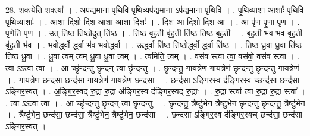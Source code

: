 \documentclass[17pt]{extarticle}
\begin{document}
28. शक्त्येति॒ शक्त्या᳚ । . अप॑द्यमाना पृथिवि पृथि॒व्यप॑द्यमा॒ना ऽप॑द्यमाना पृथिवि । . पृ॒थि॒व्याशा॒ आशाः᳚ पृथिवि पृथि॒व्याशाः᳚ । . आशा॒ दिशो॒ दिश॒ आशा॒ आशा॒ दिशः॑ । . दिश॒ आ दिशो॒ दिश॒ आ । . आ पृ॑ण पृ॒णा पृ॑ण । . पृ॒णेति॑ पृण । . उत् ति॑ष्ठ ति॒ष्ठोदुत् ति॑ष्ठ । . ति॒ष्ठ॒ बृ॒ह॒ती बृ॑ह॒ती ति॑ष्ठ तिष्ठ बृह॒ती । . बृ॒ह॒ती भ॑व भव बृह॒ती बृ॑ह॒ती भ॑व । . भ॒वो॒र्द्ध्वो र्द्ध्वा भ॑व भवो॒र्द्ध्वा । . ऊ॒र्द्ध्वा ति॑ष्ठ तिष्ठो॒र्द्ध्वो र्द्ध्वा ति॑ष्ठ । . ति॒ष्ठ॒ ध्रु॒वा ध्रु॒वा ति॑ष्ठ तिष्ठ ध्रु॒वा । . ध्रु॒वा त्वम् त्वम् ध्रु॒वा ध्रु॒वा त्वम् । . त्वमिति॒ त्वम् । . वस॑व स्त्वा त्वा॒ वस॑वो॒ वस॑व स्त्वा । . त्वा ऽऽत्वा॒ त्वा । . आ च्छृ॑न्दन्तु छृन्द॒न् त्वा छृ॑न्दन्तु । . छृ॒न्द॒न्तु॒ गा॒य॒त्रेण॑ गाय॒त्रेण॑ छृन्दन्तु छृन्दन्तु गाय॒त्रेण॑ । . गा॒य॒त्रेण॒ छन्द॑सा॒ छन्द॑सा गाय॒त्रेण॑ गाय॒त्रेण॒ छन्द॑सा । . छन्द॑सा ऽङ्गिर॒स्व द॑ङ्गिर॒स्व च्छन्द॑सा॒ छन्द॑सा ऽङ्गिर॒स्वत् । . अ॒ङ्गि॒र॒स्वद् रु॒द्रा रु॒द्रा अ॑ङ्गिर॒स्व द॑ङ्गिर॒स्वद् रु॒द्राः । . रु॒द्रा स्त्वा᳚ त्वा रु॒द्रा रु॒द्रा स्त्वा᳚ । . त्वा ऽऽत्वा॒ त्वा । . आ च्छृ॑न्दन्तु छृन्द॒न् त्वा छृ॑न्दन्तु । . छृ॒न्द॒न्तु॒ त्रैष्टु॑भेन॒ त्रैष्टु॑भेन छृन्दन्तु छृन्दन्तु॒ त्रैष्टु॑भेन । . त्रैष्टु॑भेन॒ छन्द॑सा॒ छन्द॑सा॒ त्रैष्टु॑भेन॒ त्रैष्टु॑भेन॒ छन्द॑सा । . छन्द॑सा ऽङ्गिर॒स्व द॑ङ्गिर॒स्वच् छन्द॑सा॒ छन्द॑सा ऽङ्गिर॒स्वत् । \newline
\end{document}
